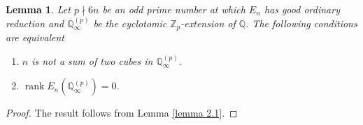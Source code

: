 \documentclass[10pt,a4paper]{amsart}
\newtheorem{lemma}{Lemma}
\newcommand{\Q}{\mathbb{Q}}
\newcommand{\Z}{\mathbb{Z}}
\newcommand{\op}[1]{\operatorname{#1}}
\begin{document}
\begin{lemma}\label{lemma3.1}
    Let $p\nmid 6n$ be an odd prime number at which $E_n$ has good ordinary reduction and $\Q_\infty^{(p)}$ be the cyclotomic $\Z_p$-extension of $\Q$. The following conditions are equivalent
    \begin{enumerate}
        \item $n$ is not a sum of two cubes in $\Q_\infty^{(p)}$. 
        \item $\op{rank} E_n(\Q_\infty^{(p)})=0$. 
    \end{enumerate}
\end{lemma}

\begin{proof}
    The result follows from Lemma \ref{lemma 2.1}.
\end{proof}
\end{document}
